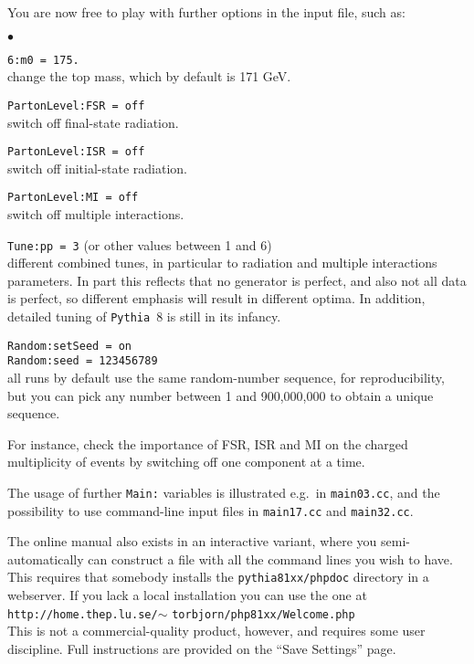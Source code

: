 \documentclass[12pt,a4paper]{article}
\newenvironment{Itemize}{\begin{list}{$\bullet$}%
{\setlength{\topsep}{0.4mm}\setlength{\partopsep}{0.4mm}%
\setlength{\itemsep}{0.4mm}\setlength{\parsep}{0.4mm}}}%
{\end{list}}
\begin{document}
You are now free to play with further options in the input file, such as:
\begin{Itemize}
\item \texttt{6:m0 = 175.}\\  
change the top mass, which by default is 171 GeV.
\item \texttt{PartonLevel:FSR = off}\\  
switch off final-state radiation.
\item \texttt{PartonLevel:ISR = off}\\  
switch off initial-state radiation.
\item \texttt{PartonLevel:MI = off}\\
switch off multiple interactions.  
\item \texttt{Tune:pp = 3} (or other values between 1 and 6) \\
different combined tunes, in particular to radiation and multiple 
interactions parameters. In part this reflects that no generator 
is perfect, and also not all data is perfect, so different emphasis 
will result in different optima. In addition, detailed tuning of 
\texttt{Pythia}~8 is still in its infancy.  
\item \texttt{Random:setSeed = on}\\
\texttt{Random:seed = 123456789}\\
all runs by default use the same random-number sequence, for reproducibility,
but you can pick any number between 1 and 900,000,000 to obtain a unique
sequence.
\end{Itemize}
For instance, check the importance of FSR, ISR and MI on the charged 
multiplicity of events by switching off one component at a time.

The usage of further \texttt{Main:} variables is illustrated e.g.\ in
\texttt{main03.cc}, and the possibility to use command-line input
files in \texttt{main17.cc} and \texttt{main32.cc}. 

The online manual also exists in an interactive variant, where you
semi-automatically can construct a file with all the command lines you
wish to have. This requires that somebody installs the 
\texttt{pythia81xx/phpdoc} directory in a webserver. If you lack a local
installation you can use the one at\\
\hspace*{10mm}\texttt{http://home.thep.lu.se/}$\sim$%
\texttt{torbjorn/php81xx/Welcome.php}\\
This is not a commercial-quality product, however, and requires some
user discipline. Full instructions are provided on the ``Save Settings''
page.
\end{document}
